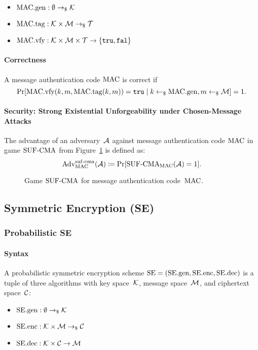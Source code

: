 \documentclass[a4paper,orivec]{llncs}
\begin{document}
\begin{itemize}
    \item $\mathrm{MAC}.\mathrm{gen}: \emptyset \to_\$ \mathcal{K}$
    \item $\mathrm{MAC}.\mathrm{tag}: \mathcal{K}\times\mathcal{M} \to_\$ \mathcal{T}$
    \item $\mathrm{MAC}.\mathrm{vfy}: \mathcal{K}\times\mathcal{M}\times\mathcal{T} \to \{\mathtt{tru},\mathtt{fal}\}$
\end{itemize}

\paragraph{Correctness}
A message authentication code $\mathrm{MAC}$ is correct if
\[
\Pr[\mathrm{MAC}.\mathrm{vfy}(k,m,\mathrm{MAC}.\mathrm{tag}(k,m))=\mathtt{tru}\mid k\gets_\$\mathrm{MAC}.\mathrm{gen},m\gets_\$\mathcal{M}]=1\text{.}
\]

\paragraph{Security: Strong Existential Unforgeability under Chosen-Message Attacks}
The advantage of an adversary~$\mathcal{A}$ against message authentication code $\mathrm{MAC}$ in game ${\mathrm{SUF}\text{-}\mathrm{CMA}}$ from Figure~\ref{fig:mac:suf} is defined as:
\[
\mathrm{Adv}_{\mathrm{MAC}}^{\mathrm{suf}\text{-}\mathrm{cma}}(\mathcal{A})\coloneqq\Pr[{\mathrm{SUF}\text{-}\mathrm{CMA}}_{\mathrm{MAC}}(\mathcal{A})=1]\text{.}
\]

\begin{figure}[!ht]
    \centering
    \nicoresetlinenr%
    \fbox{%
        \scalebox{\codescalefactor}{%
        }%
    }
    \caption{%
        Game ${\mathrm{SUF}\text{-}\mathrm{CMA}}$ for message authentication code~$\mathrm{MAC}$.
    }
    \label{fig:mac:suf}
\end{figure}


\subsection{Symmetric Encryption (SE)}

\subsubsection{Probabilistic SE}

\paragraph{Syntax}
A probabilistic symmetric encryption scheme $\mathrm{SE}=(\mathrm{SE}.\mathrm{gen},\mathrm{SE}.\mathrm{enc},\mathrm{SE}.\mathrm{dec})$ is a tuple of three algorithms with key space~$\mathcal{K}$, message space~$\mathcal{M}$, and ciphertext space~$\mathcal{C}$:

\begin{itemize}
    \item $\mathrm{SE}.\mathrm{gen}: \emptyset \to_\$ \mathcal{K}$
    \item $\mathrm{SE}.\mathrm{enc}: \mathcal{K}\times\mathcal{M} \to_\$ \mathcal{C}$
    \item $\mathrm{SE}.\mathrm{dec}: \mathcal{K}\times\mathcal{C} \to \mathcal{M}$
\end{itemize}
\end{document}
